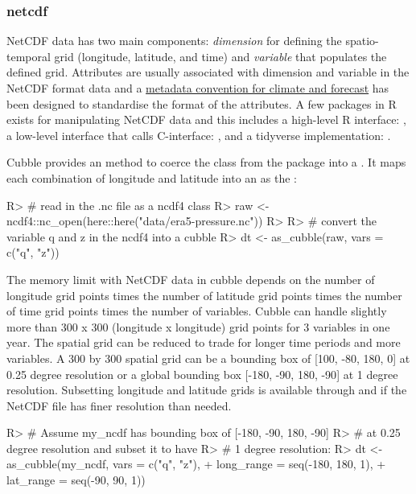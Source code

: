 \documentclass[
]{jss}
\begin{document}
\hypertarget{netcdf}{%
\subsubsection{netcdf}\label{netcdf}}

NetCDF data has two main components: \emph{dimension} for defining the
spatio-temporal grid (longitude, latitude, and time) and \emph{variable}
that populates the defined grid. Attributes are usually associated with
dimension and variable in the NetCDF format data and a
\href{http://cfconventions.org/}{metadata convention for climate and
forecast} has been designed to standardise the format of the attributes.
A few packages in R exists for manipulating NetCDF data and this
includes a high-level R interface:  \citep{ncdf4}, a
low-level interface that calls C-interface: 
\citep{rnetcdf, michna2013rnetcdf}, and a tidyverse implementation:
 \citep{tidync}.

Cubble provides an  method to coerce the 
class from the  package into a . It maps each
combination of longitude and latitude into an  as the
:

\begin{CodeChunk}
\begin{CodeInput}
R> # read in the .nc file as a ncdf4 class
R> raw <- ncdf4::nc_open(here::here("data/era5-pressure.nc"))
R> 
R> # convert the variable q and z in the ncdf4 into a cubble
R> dt <- as_cubble(raw, vars = c("q", "z"))
\end{CodeInput}
\end{CodeChunk}

The memory limit with NetCDF data in cubble depends on the number of
longitude grid points times the number of latitude grid points times the
number of time grid points times the number of variables. Cubble can
handle slightly more than 300 x 300 (longitude x longitude) grid points
for 3 variables in one year. The spatial grid can be reduced to trade
for longer time periods and more variables. A 300 by 300 spatial grid
can be a bounding box of {[}100, -80, 180, 0{]} at 0.25 degree
resolution or a global bounding box {[}-180, -90, 180, -90{]} at 1
degree resolution. Subsetting longitude and latitude grids is available
through  and  if the NetCDF file has
finer resolution than needed.

\begin{CodeChunk}
\begin{CodeInput}
R> # Assume my_ncdf has bounding box of [-180, -90, 180, -90]
R> # at 0.25 degree resolution and subset it to have
R> # 1 degree resolution:
R> dt <- as_cubble(my_ncdf, vars = c("q", "z"),
+                 long_range = seq(-180, 180, 1),
+                 lat_range = seq(-90, 90, 1))
\end{CodeInput}
\end{CodeChunk}
\end{document}
